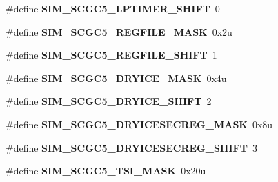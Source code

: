 \begin{DoxyCompactItemize}
\item 
\hypertarget{group___s_i_m___register___masks_ga1ec7e922a8cb572c9725097c52fca617}{}\#define {\bfseries S\+I\+M\+\_\+\+S\+C\+G\+C5\+\_\+\+L\+P\+T\+I\+M\+E\+R\+\_\+\+S\+H\+I\+F\+T}~0\label{group___s_i_m___register___masks_ga1ec7e922a8cb572c9725097c52fca617}

\item 
\hypertarget{group___s_i_m___register___masks_gad5e364578334b357ddb52d51b45d6916}{}\#define {\bfseries S\+I\+M\+\_\+\+S\+C\+G\+C5\+\_\+\+R\+E\+G\+F\+I\+L\+E\+\_\+\+M\+A\+S\+K}~0x2u\label{group___s_i_m___register___masks_gad5e364578334b357ddb52d51b45d6916}

\item 
\hypertarget{group___s_i_m___register___masks_ga9c3821fd40039187ef6b4b01940aa04c}{}\#define {\bfseries S\+I\+M\+\_\+\+S\+C\+G\+C5\+\_\+\+R\+E\+G\+F\+I\+L\+E\+\_\+\+S\+H\+I\+F\+T}~1\label{group___s_i_m___register___masks_ga9c3821fd40039187ef6b4b01940aa04c}

\item 
\hypertarget{group___s_i_m___register___masks_ga45ae899ca8bfefa2756dc48584fd6712}{}\#define {\bfseries S\+I\+M\+\_\+\+S\+C\+G\+C5\+\_\+\+D\+R\+Y\+I\+C\+E\+\_\+\+M\+A\+S\+K}~0x4u\label{group___s_i_m___register___masks_ga45ae899ca8bfefa2756dc48584fd6712}

\item 
\hypertarget{group___s_i_m___register___masks_gaef6af64825f9beb24070231813683d09}{}\#define {\bfseries S\+I\+M\+\_\+\+S\+C\+G\+C5\+\_\+\+D\+R\+Y\+I\+C\+E\+\_\+\+S\+H\+I\+F\+T}~2\label{group___s_i_m___register___masks_gaef6af64825f9beb24070231813683d09}

\item 
\hypertarget{group___s_i_m___register___masks_ga26814997fb532ec3b5866e3edc791ca3}{}\#define {\bfseries S\+I\+M\+\_\+\+S\+C\+G\+C5\+\_\+\+D\+R\+Y\+I\+C\+E\+S\+E\+C\+R\+E\+G\+\_\+\+M\+A\+S\+K}~0x8u\label{group___s_i_m___register___masks_ga26814997fb532ec3b5866e3edc791ca3}

\item 
\hypertarget{group___s_i_m___register___masks_ga7d5b101a0a1666cb042bc0a462ef7598}{}\#define {\bfseries S\+I\+M\+\_\+\+S\+C\+G\+C5\+\_\+\+D\+R\+Y\+I\+C\+E\+S\+E\+C\+R\+E\+G\+\_\+\+S\+H\+I\+F\+T}~3\label{group___s_i_m___register___masks_ga7d5b101a0a1666cb042bc0a462ef7598}

\item 
\hypertarget{group___s_i_m___register___masks_ga12aa3509d85f1dddc69c48821f4f3225}{}\#define {\bfseries S\+I\+M\+\_\+\+S\+C\+G\+C5\+\_\+\+T\+S\+I\+\_\+\+M\+A\+S\+K}~0x20u\label{group___s_i_m___register___masks_ga12aa3509d85f1dddc69c48821f4f3225}


\end{DoxyCompactItemize}
